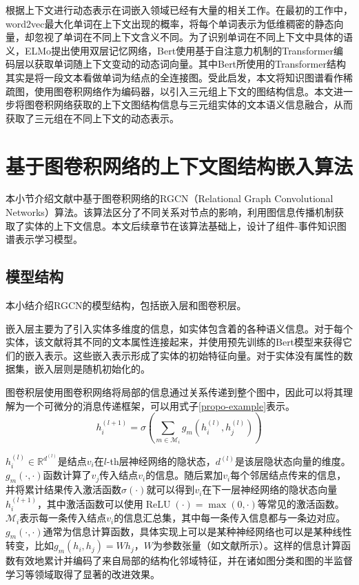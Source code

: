 根据上下文进行动态表示在词嵌入领域已经有大量的相关工作。在最初的工作中，word2vec\cite{mikolov2013efficient}最大化单词在上下文出现的概率，将每个单词表示为低维稠密的静态向量，却忽视了单词在不同上下文含义不同。为了识别单词在不同上下文中具体的语义，ELMo\cite{peters2018deep}提出使用双层记忆网络，Bert\cite{devlin2018bert}使用基于自注意力机制的Transformer\cite{vaswani2017attention}编码层以获取单词随上下文变动的动态词向量。其中Bert所使用的Transformer结构其实是将一段文本看做单词为结点的全连接图。受此启发，本文将知识图谱看作稀疏图，使用图卷积网络作为编码器，以引入三元组上下文的图结构信息。本文进一步将图卷积网络获取的上下文图结构信息与三元组实体的文本语义信息融合，从而获取了三元组在不同上下文的动态表示。



\section{基于图卷积网络的上下文图结构嵌入算法}\label{RGCN}
本小节介绍文献\parencite{schlichtkrull2018modeling}中基于图卷积网络的RGCN（Relational Graph Convolutional Networks）算法。该算法区分了不同关系对节点的影响，利用图信息传播机制获取了实体的上下文信息。本文后续章节在该算法基础上，设计了组件-事件知识图谱表示学习模型。
\subsection{模型结构}
本小结介绍RGCN的模型结构，包括嵌入层和图卷积层。

嵌入层主要为了引入实体多维度的信息，如实体包含着的各种语义信息。对于每个实体，该文献将其不同的文本属性连接起来，并使用预先训练的Bert模型来获得它们的嵌入表示。这些嵌入表示形成了实体的初始特征向量。对于实体没有属性的数据集，嵌入层则是随机初始化的。

图卷积层使用图卷积网络将局部的信息通过关系传递到整个图中，因此可以将其理解为一个可微分的消息传递框架，可以用式子\ref{propo-example}表示。
\begin{equation}
    h_{i}^{(l+1)}=\sigma\left(\sum_{m \in \mathcal{M}_{i}} g_{m}\left(h_{i}^{(l)}, h_{j}^{(l)}\right)\right)
    \label{propo-example}
\end{equation}

$h_{i}^{(l)} \in \mathbb{R}^{d^{(l)}}$是结点$v_{i}$在$l$-th层神经网络的隐状态，$d^{(l)}$是该层隐状态向量的维度。$g_{m}(\cdot, \cdot)$函数计算了$v_{j}$传入结点$v_{i}$的信息。随后累加$v_{i}$每个邻居结点传来的信息，并将累计结果传入激活函数$\sigma(\cdot)$就可以得到$v_{i}$在下一层神经网络的隐状态向量$h_{i}^{(l+1)}$，其中激活函数可以使用$\operatorname{ReLU}(\cdot)=\max (0, \cdot)$等常见的激活函数。$\mathcal{M}_{i}$表示每一条传入结点$v_{i}$的信息汇总集，其中每一条传入信息都与一条边对应。$g_{m}(\cdot, \cdot)$通常为信息计算函数，具体实现上可以是某种神经网络也可以是某种线性转变，比如$g_{m}\left(h_{i}, h_{j}\right)=W h_{j}$，$W$为参数张量（如文献\parencite{kipf2016semi}所示）。这样的信息计算函数有效地累计并编码了来自局部的结构化邻域特征，并在诸如图分类\cite{duvenaud2015convolutional}和图的半监督学习等领域取得了显著的改进效果。

